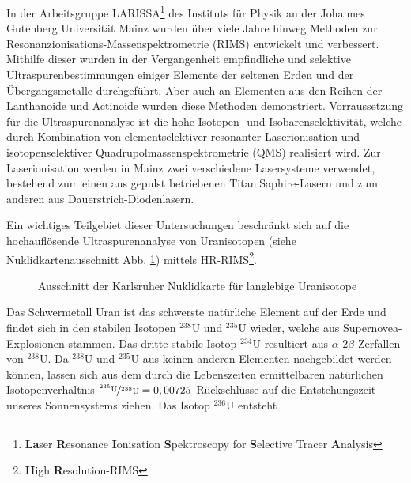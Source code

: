 In der Arbeitsgruppe LARISSA\footnote{\textbf{La}ser \textbf{R}esonance
\textbf{I}onisation \textbf{S}pektroscopy for \textbf{S}elective Tracer
\textbf{A}nalysis} des Instituts für Physik an der Johannes Gutenberg
Universität Mainz wurden über viele Jahre hinweg Methoden zur
Resonanzionisations-Massenspektrometrie (RIMS) entwickelt und verbessert.
Mithilfe dieser wurden in der Vergangenheit empfindliche und selektive
Ultraspurenbestimmungen einiger Elemente der seltenen Erden und der
Übergangsmetalle durchgeführt. Aber auch an Elementen aus den Reihen der
Lanthanoide und Actinoide wurden diese Methoden demonstriert. Vorraussetzung für
die Ultraspurenanalyse ist die hohe Isotopen- und Isobarenselektivität, welche
durch Kombination von elementselektiver resonanter Laserionisation und
isotopenselektiver Quadrupolmassenspektrometrie (QMS) realisiert wird.
Zur Laserionisation werden in Mainz zwei verschiedene Lasersysteme verwendet, bestehend zum einen
aus gepulst betriebenen Titan:Saphire-Lasern und zum anderen aus
Dauerstrich-Diodenlasern.\par
Ein wichtiges Teilgebiet dieser Untersuchungen beschränkt sich auf die
hochauflösende Ultraspurenanalyse von Uranisotopen (siehe Nuklidkartenausschnitt Abb.
\ref{fig:uran_nuklidkarte}) mittels HR-RIMS\footnote{\textbf{H}igh
\textbf{R}esolution-RIMS}.
\begin{figure}[h]
 	\centering
	\caption[Gesamter experimenteller Aufbau,
	schematisch]{Ausschnitt der Karlsruher Nuklidkarte für langlebige
	Uranisotope \cite{nuklidkarte}}\label{fig:uran_nuklidkarte}
\end{figure}
Das Schwermetall Uran ist das schwerste natürliche Element auf der Erde und
findet sich in den stabilen Isotopen $^{238}$U und $^{235}$U wieder, welche aus
Supernovea-Explosionen stammen. Das dritte stabile Isotop $^{234}$U
resultiert aus $\alpha$-$2\beta$-Zerfällen von $^{238}$U. Da $^{238}$U und
$^{235}$U aus keinen anderen Elementen nachgebildet werden können, lassen sich
aus dem durch die Lebenszeiten ermittelbaren natürlichen Isotopenverhältnis
$\nicefrac{^{235}\text{U}}{^{238}\text{U}}=0,00725$ Rückschlüsse auf die
Entstehungszeit unseres Sonnensystems ziehen. Das Isotop $^{236}$U entsteht
